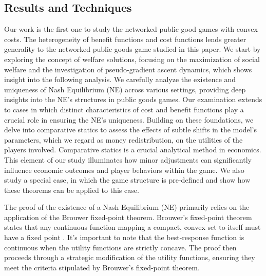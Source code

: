 
\subsection{Results and Techniques}
Our work is the first one to study the networked public good games with convex costs. The heterogeneity of benefit functions and cost functions lends greater generality to the networked public goods game studied in this paper.
We start by exploring the concept of welfare solutions, focusing on the maximization of social welfare and the investigation of pseudo-gradient ascent dynamics, which shows insight into the following analysis. We carefully analyze the existence and uniqueness of Nash Equilibrium (NE) across various settings, providing deep insights into the NE's structures in public goods games. Our examination extends to cases in which distinct characteristics of cost and benefit functions play a crucial role in ensuring the NE's uniqueness. Building on these foundations, we delve into comparative statics to assess the effects of subtle shifts in the model's parameters, which we regard as money redistribution, on the utilities of the players involved. Comparative statics is a crucial analytical method in economics. This element of our study illuminates how minor adjustments can significantly influence economic outcomes and player behaviors within the game.
We also study a special case, in which the game structure is pre-defined and show how these theorems can be applied to this case.

The proof of the existence of a Nash Equilibrium (NE) primarily relies on the application of the Brouwer fixed-point theorem.
Brouwer's fixed-point theorem states that any continuous function mapping a compact, convex set to itself must have a fixed point \cite{brouwer:brouwer1911abbildung}. 
It's important to note that the best-response function is continuous when the utility functions are strictly concave. The proof then proceeds through a strategic modification of the utility functions, ensuring they meet the criteria stipulated by Brouwer's fixed-point theorem.

